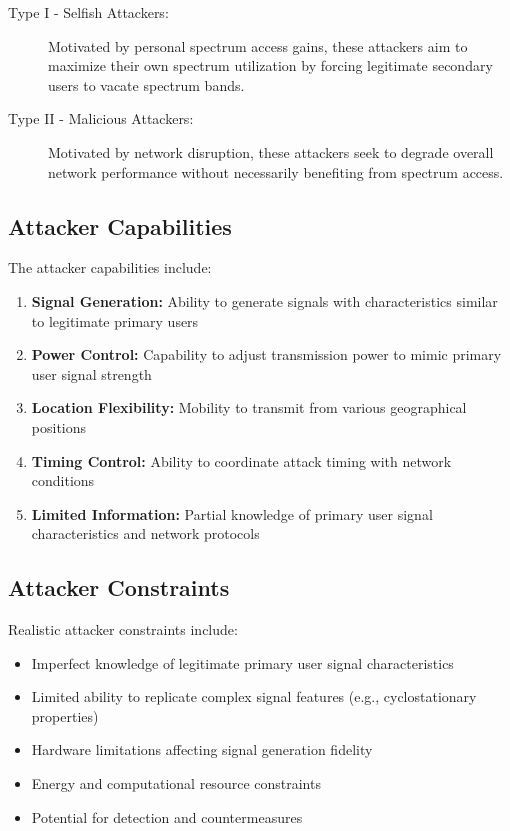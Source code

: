 \begin{description}
\item[Type I - Selfish Attackers:] Motivated by personal spectrum access gains, these attackers aim to maximize their own spectrum utilization by forcing legitimate secondary users to vacate spectrum bands.

\item[Type II - Malicious Attackers:] Motivated by network disruption, these attackers seek to degrade overall network performance without necessarily benefiting from spectrum access.
\end{description}

\subsection{Attacker Capabilities}
The attacker capabilities include:

\begin{enumerate}
\item \textbf{Signal Generation:} Ability to generate signals with characteristics similar to legitimate primary users
\item \textbf{Power Control:} Capability to adjust transmission power to mimic primary user signal strength
\item \textbf{Location Flexibility:} Mobility to transmit from various geographical positions
\item \textbf{Timing Control:} Ability to coordinate attack timing with network conditions
\item \textbf{Limited Information:} Partial knowledge of primary user signal characteristics and network protocols
\end{enumerate}

\subsection{Attacker Constraints}
Realistic attacker constraints include:

\begin{itemize}
\item Imperfect knowledge of legitimate primary user signal characteristics
\item Limited ability to replicate complex signal features (e.g., cyclostationary properties)
\item Hardware limitations affecting signal generation fidelity
\item Energy and computational resource constraints
\item Potential for detection and countermeasures
\end{itemize}


